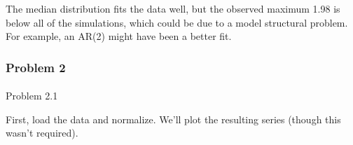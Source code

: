 \documentclass[
  letterpaper,
  DIV=11,
  numbers=noendperiod]{scrartcl}
\makeatletter
\let\oldparagraph\paragraph
\renewcommand{\paragraph}{
    \@ifstar
      \xxxParagraphStar
      \xxxParagraphNoStar
  }
\newcommand{\xxxParagraphStar}[1]{\oldparagraph*{#1}\mbox{}}
\newcommand{\xxxParagraphNoStar}[1]{\oldparagraph{#1}\mbox{}}
\makeatother
\begin{document}
The median distribution fits the data well, but the observed maximum
1.98 is below all of the simulations, which could be due to a model
structural problem. For example, an AR(2) might have been a better fit.

\subsubsection{Problem 2}\label{problem-2}

\paragraph{Problem 2.1}\label{problem-2.1}

First, load the data and normalize. We'll plot the resulting series
(though this wasn't required).
\end{document}
